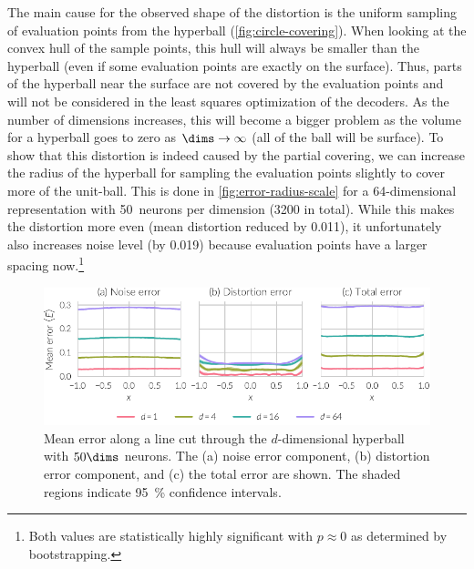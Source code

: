 The main cause for the observed shape of the distortion is the uniform sampling of evaluation points from the hyperball (\cref{fig:circle-covering}).
When looking at the convex hull of the sample points, this hull will always be smaller than the hyperball (even if some evaluation points are exactly on the surface).
Thus, parts of the hyperball near the surface are not covered by the evaluation points and will not be considered in the least squares optimization of the decoders.
As the number of dimensions increases, this will become a bigger problem as the volume for a hyperball goes to zero as $\dims \rightarrow \infty$ (all of the ball will be surface).
To show that this distortion is indeed caused by the partial covering, we can increase the radius of the hyperball for sampling the evaluation points slightly to cover more of the unit-ball.
This is done in \cref{fig:error-radius-scale} for a 64-dimensional representation with \num{50}~neurons per dimension (\num{3200} in total).
While this makes the distortion more even (mean distortion reduced by \num{0.011}), it unfortunately also increases noise level (by \num{0.019}) because evaluation points have a larger spacing now.\footnote{Both values are statistically highly significant with $p \approx 0$ as determined by bootstrapping.}
\begin{figure}
    \centering
    \includegraphics{figures/error-linecut}
    \caption[Mean error along line cut through hyperball]{Mean error along a line cut through the $d$-dimensional hyperball with $50\dims$ neurons. The (a) noise error component, (b) distortion error component, and (c) the total error are shown. The shaded regions indicate \SI{95}{\percent} confidence intervals.}\label{fig:error-linecut}
\end{figure}
